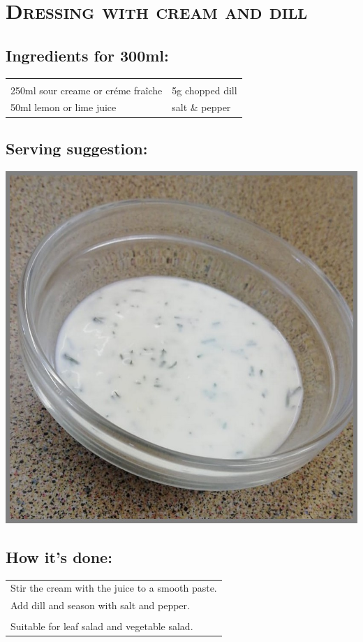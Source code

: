 \section{\textsc{Dressing with cream and dill}}

\subsection*{Ingredients for 300ml:}

\begin{tabular}{p{7.5cm} p{7.5cm}}
	& \\
	250ml sour creame or créme fraîche & 5g chopped dill\\
	50ml lemon or lime juice & salt \& pepper
\end{tabular}

\subsection*{Serving suggestion:}

\includegraphics[width=\textwidth]{img/d_dillsahne.jpeg} \cite{dsahnedill}

\subsection*{How it's done:}

\begin{tabular}{p{15cm}}
	\\
	Stir the cream with the juice to a smooth paste.\\
	Add dill and season with salt and pepper.\\
	\\
	Suitable for leaf salad and vegetable salad.
\end{tabular}
